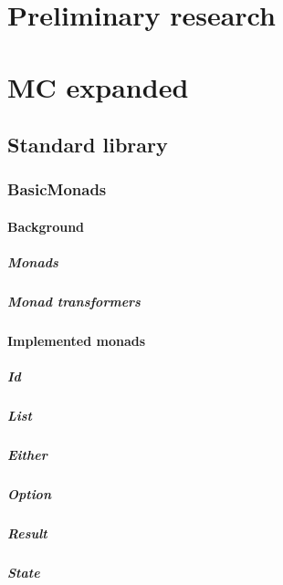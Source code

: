 \begin{multicols}{3}


\part{Preliminary research}



\part{MC expanded}
% 

\chapter{Standard library}
\section{BasicMonads}
\subsection{Background}
\subsubsection{Monads}
\subsubsection{Monad transformers}
\subsection{Implemented monads}
\subsubsection{Id}
\subsubsection{List}
\subsubsection{Either}
\subsubsection{Option}
\subsubsection{Result}
\subsubsection{State}

\end{multicols}
